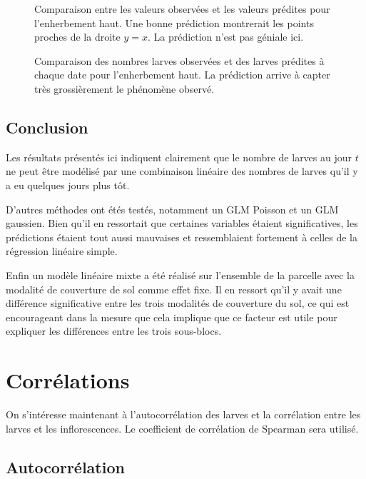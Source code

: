 \documentclass[a4paper, 11pt]{article}
\begin{document}
\begin{figure}[ht]
 \centering
 \caption{Comparaison entre les valeurs observées et les valeurs prédites pour l'enherbement haut. Une bonne prédiction montrerait les points proches de la droite $y=x$. La prédiction n'est pas géniale ici.}
 \label{fig:lmeh1}
\end{figure}

\begin{figure}[ht]
 \centering
 \caption{Comparaison des nombres larves observées et des larves prédites à chaque date pour l'enherbement haut. La prédiction arrive  à capter très grossièrement le phénomène observé. }
 \label{fig:lmeh2}
\end{figure}

\clearpage
\subsection{Conclusion}

Les résultats présentés ici indiquent clairement que le nombre de larves au jour $t$ ne peut être modélisé par une combinaison linéaire des nombres de larves qu'il y a eu quelques jours plus tôt.

D'autres méthodes ont étés testés, notamment un GLM Poisson et un GLM gaussien. Bien qu'il en ressortait que certaines variables étaient significatives, les prédictions étaient tout aussi mauvaises et ressemblaient fortement à celles de la régression linéaire simple.

Enfin un modèle linéaire mixte a été réalisé sur l'ensemble de la parcelle avec la modalité de couverture de sol comme effet fixe. Il en ressort qu'il y avait une différence significative entre les trois modalités de couverture du sol, ce qui est encourageant dans la mesure que cela implique que ce facteur est utile pour expliquer les différences entre les trois sous-blocs.

\section{Corrélations}

On s'intéresse maintenant à l'autocorrélation des larves et la corrélation entre les larves et les inflorescences. Le coefficient de corrélation de Spearman sera utilisé.

\subsection{Autocorrélation}
\end{document}
